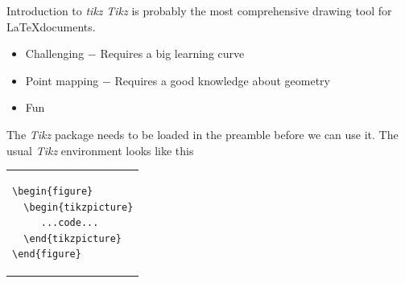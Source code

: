 \documentclass{beamer}\usepackage[]{graphicx}\usepackage[]{color}
\begin{document}
\begin{frame}[fragile]{Introduction to \emph{\textrm{tikz}}}
\textrm{\emph{Tikz}} is probably the most comprehensive drawing tool for \LaTeX documents. 
  \begin{itemize}
    \pause\item Challenging $-$ Requires a big learning curve
    \pause\item Point mapping $-$ Requires a good knowledge about geometry
    \pause\item Fun
  \end{itemize}
\pause
The \textrm{\emph{Tikz}} package needs to be loaded in the preamble before we can use it. The usual \textrm{\emph{Tikz}} environment looks like this

\begin{table}\small\vspace{-.25in}
\begin{tabular}{p{4cm}}
\begin{verbatim}
\begin{figure}
  \begin{tikzpicture}
     ...code...
  \end{tikzpicture}
\end{figure}
\end{verbatim}
\end{tabular}
\end{table}
\end{frame}
\end{document}
